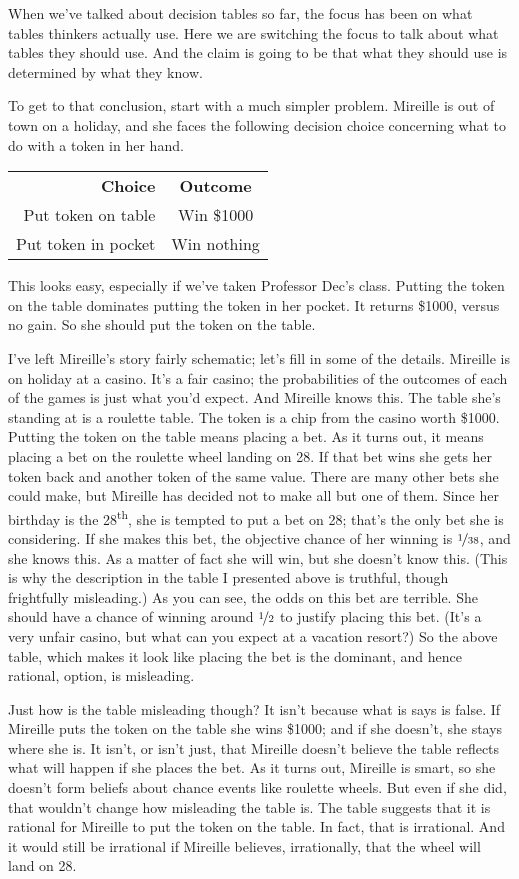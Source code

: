 \documentclass[11pt,]{book}
\def\toprule{}
\def\bottomrule{}
\begin{document}
When we've talked about decision tables so far, the focus has been on what tables thinkers actually use. Here we are switching the focus to talk about what tables they should use. And the claim is going to be that what they should use is determined by what they know.

To get to that conclusion, start with a much simpler problem. Mireille is out of town on a holiday, and she faces the following decision choice concerning what to do with a token in her hand.

\begin{longtable}[]{@{}rc@{}}
\toprule
\endhead
\textbf{Choice} & \textbf{Outcome}\tabularnewline
Put token on table & Win \$1000\tabularnewline
Put token in pocket & Win nothing\tabularnewline
\bottomrule
\end{longtable}

This looks easy, especially if we've taken Professor Dec's class. Putting the token on the table dominates putting the token in her pocket. It returns \$1000, versus no gain. So she should put the token on the table.

I've left Mireille's story fairly schematic; let's fill in some of the details. Mireille is on holiday at a casino. It's a fair casino; the probabilities of the outcomes of each of the games is just what you'd expect. And Mireille knows this. The table she's standing at is a roulette table. The token is a chip from the casino worth \$1000.
Putting the token on the table means placing a bet. As it turns out, it means placing a bet on the roulette wheel landing on 28. If that bet wins she gets her token back and another token of the same value. There are many other bets she could make, but Mireille has decided not to make all but one of them. Since her birthday is the 28\textsuperscript{th}, she is tempted to put a bet on 28; that's the only bet she is considering. If she makes this bet, the objective chance of her winning is \(\nicefrac{1}{38}\), and she knows this. As a matter of fact she will win, but she doesn't know this. (This is why the description in the table I presented above is truthful, though frightfully misleading.) As you can see, the odds on this bet are terrible. She should have a chance of winning around \(\nicefrac{1}{2}\) to justify placing this bet. (It's a very unfair casino, but what can you expect at a vacation resort?) So the above table, which makes it look like placing the bet is the dominant, and hence rational, option, is misleading.

Just how is the table misleading though? It isn't because what is says is false. If Mireille puts the token on the table she wins \$1000; and if she doesn't, she stays where she is. It isn't, or isn't just, that Mireille doesn't believe the table reflects what will happen if she places the bet. As it turns out, Mireille is smart, so she doesn't form beliefs about chance events like roulette wheels. But even if she did, that wouldn't change how misleading the table is. The table suggests that it is rational for Mireille to put the token on the table. In fact, that is irrational. And it would still be irrational if Mireille believes, irrationally, that the wheel will land on 28.
\end{document}
